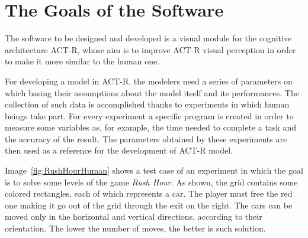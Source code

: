 	\section{The Goals of the Software}\label{TeamGoal}
	The software to be designed and developed is a visual module for the cognitive architecture ACT-R, whose aim is to improve ACT-R visual perception in order to make it more similar to the human one. 
	
	For developing a model in ACT-R, the modelers need a series of parameters on which basing their assumptions about the model itself and its performances.
	The collection of such data is accomplished thanks to experiments in which human beings take part. 
	For every experiment a specific program is created in order to measure some variables as, for example, the time needed to complete a task and the accuracy of the result.
	The parameters obtained by these experiments are then used as a reference for the development of ACT-R model.

 
	Image~\ref{fig:RushHourHuman} shows a test case of an experiment in which the goal is to solve some levels of the game \emph{Rush Hour}. As shown, the grid contains some colored rectangles, each of which represents a car. The player must free the red one making it go out of the grid through the exit on the right. The cars can be moved only in the horizontal and vertical directions, according to their orientation. %
	The lower the number of moves, the better is such solution.

